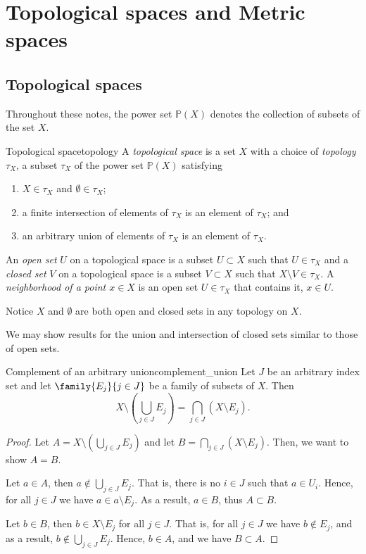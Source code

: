 \chapter{Topological spaces and Metric spaces}

\section{Topological spaces}
Throughout these notes, the power set \(\mathbb{P}(X)\) denotes the collection of subsets of the set \(X\).
\begin{definition}{Topological space}{topology}
    A \emph{topological space}  is a set \(X\) with a choice of \emph{topology} \(\tau_X\), a subset \(\tau_X\) of the power set \(\mathbb{P}(X)\) satisfying
    \begin{enumerate}[label=(\alph*)]
        \item \(X \in \tau_X\) and \(\emptyset \in \tau_X\);
        \item a finite intersection of elements of \(\tau_X\) is an element of \(\tau_X\); and
        \item an arbitrary union of elements of \(\tau_X\) is an element of \(\tau_X\).
    \end{enumerate}
    An \emph{open set} \(U\) on a topological space is a subset \(U \subset X\) such that \(U \in \tau_X\) and a \emph{closed set} \(V\) on a topological space is a subset \(V \subset X\) such that \(X \setminus V \in \tau_X\). A \emph{neighborhood of a point \(x \in X\)} is an open set \(U \in \tau_X\) that contains it, \(x \in U\).
\end{definition}
\begin{remark}
    Notice \(X\) and \(\emptyset\) are both open and closed sets in any topology on \(X\).
\end{remark}

We may show results for the union and intersection of closed sets similar to those of open sets.
\begin{lemma}{Complement of an arbitrary union}{complement_union}
    Let \(J\) be an arbitrary index set and let \(\family{E_j}{j\in J}\) be a family of subsets of \(X\). Then
    \begin{equation*}
        X \setminus \left(\bigcup_{j\in J} E_j\right) = \bigcap_{j \in J} \left(X \setminus E_j\right).
    \end{equation*}
\end{lemma}
\begin{proof}
    Let \(A = X \setminus\left(\bigcup_{j \in J} E_j\right)\) and let \(B = \bigcap_{j \in J} \left(X \setminus E_j\right)\). Then, we want to show \(A = B\).

    Let \(a \in A\), then \(a \notin \bigcup_{j \in J} E_j\). That is, there is no \(i \in J\) such that \(a \in U_i\). Hence, for all \(j \in J\) we have \(a \in a \setminus E_j\). As a result, \(a \in B\), thus \(A \subset B\).

    Let \(b \in B\), then \(b \in X \setminus E_j\) for all \(j \in J\). That is, for all \(j \in J\) we have \(b \notin E_j\), and as a result, \(b \notin \bigcup_{j \in J} E_j\). Hence, \(b \in A\), and we have \(B \subset A\).
\end{proof}

